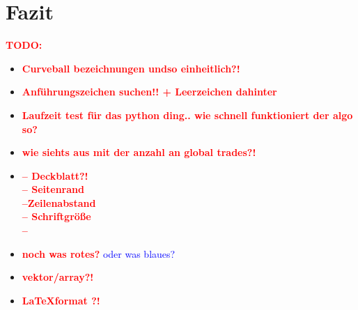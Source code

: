 \documentclass[a4paper, 11pt]{scrbook}
\theoremstyle{plain} %
\theoremstyle{definition} %
\newcommand{\cb}{Curveball}
\newcommand{\red}[1]{\textcolor{red}{\textbf{#1}}}
\newcommand{\blue}[1]{\textcolor{blue}{#1}}
\begin{document}
\chapter{Fazit}




\newpage
\red{\Huge TODO:}
\begin{itemize}
	\item \red{\Large \cb{} bezeichnungen undso einheitlich?!}
	\item \red{\Large Anführungszeichen suchen!! + Leerzeichen dahinter}
	\item \red{\huge Laufzeit test für das python ding.. wie schnell funktioniert der algo so?}
	\item \red{wie siehts aus mit der anzahl an global trades?!}
	\item \red{\Large -- Deckblatt?! \\ -- Seitenrand \\ --Zeilenabstand \\ -- Schriftgröße \\ --}
	\item \red{noch was rotes?} \blue{oder was blaues?}
	\item \red{vektor/array?!}
	\item \red{\LaTeX format ?!}
\end{itemize}













\listoffigures{}
\listoftables{}
\end{document}
